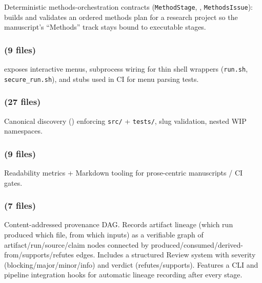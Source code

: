 \documentclass[
  english,
]{article}
\begin{document}
Deterministic methods-orchestration contracts (\texttt{MethodStage},
, \texttt{MethodsIssue}): builds and
validates an ordered methods plan for a research project so the
manuscript's ``Methods'' track stays bound to executable stages.

\subsubsection{\texorpdfstring{ (9
files)}{infrastructure.orchestration (9 files)}}\label{infrastructure.orchestration-9-files}

 exposes interactive
menus, subprocess wiring for thin shell wrappers (\texttt{run.sh},
\texttt{secure\_run.sh}), and stubs used in CI for menu parsing tests.

\subsubsection{\texorpdfstring{ (27
files)}{infrastructure.project (27 files)}}\label{infrastructure.project-27-files}

Canonical discovery () enforcing
\texttt{src/} + \texttt{tests/}, slug validation, nested WIP namespaces.

\subsubsection{\texorpdfstring{ (9
files)}{infrastructure.prose (9 files)}}\label{infrastructure.prose-9-files}

Readability metrics + Markdown tooling for prose-centric manuscripts /
CI gates.

\subsubsection{\texorpdfstring{ (7
files)}{infrastructure.provenance (7 files)}}\label{infrastructure.provenance-7-files}

Content-addressed provenance DAG. Records artifact lineage (which run
produced which file, from which inputs) as a verifiable graph of
artifact/run/source/claim nodes connected by
produced/consumed/derived-from/supports/refutes edges. Includes a
structured Review system with severity (blocking/major/minor/info) and
verdict (refutes/supports). Features a CLI and pipeline integration
hooks for automatic lineage recording after every stage.
\end{document}
